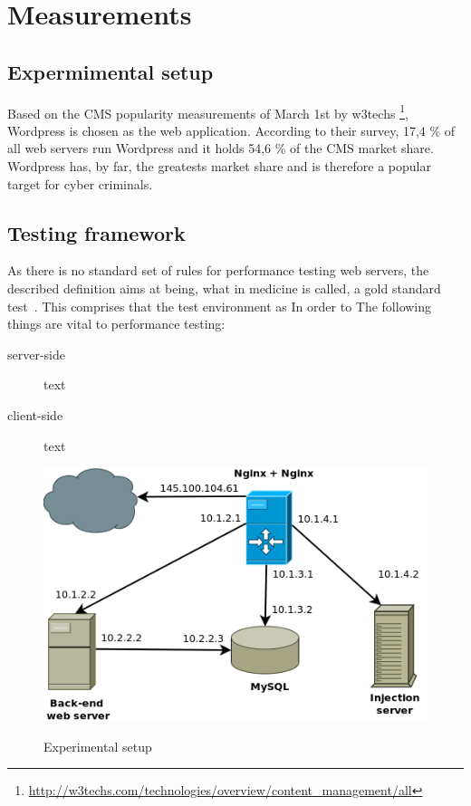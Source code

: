 \documentclass[Measurements]{subfiles}
\begin{document}
\section{Measurements}
\label{sec:Measurements}

\subsection{Expermimental setup}
Based on the \ac{CMS} popularity measurements of March 1st by w3techs \footnote{\url{http://w3techs.com/technologies/overview/content_management/all}}, Wordpress is chosen as the web application. According to their survey, 17,4 \% of all web servers run Wordpress and it holds 54,6 \% of the CMS market share. Wordpress has, by far, the greatests market share and is therefore a popular target for cyber criminals.

\subsection{Testing framework}
As there is no standard set of rules for performance testing web servers, the described definition aims at being, what in medicine is called, a gold standard test~\cite{wacholder1993validation}. This comprises that the test environment as 
In order to The following things are vital to performance testing:

\begin{description} 
 \item[server-side] text 
 \item[client-side] text
\end{description}

\begin{figure}[h]
\caption{Experimental setup}
\centering
\includegraphics[scale=0.4] {images/infrastructure.png}
\label{fig:Experimental setup}
\end{figure}
\end{document}
